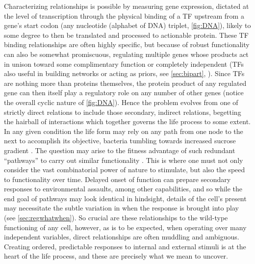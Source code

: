 Characterizing relationships is possible by measuring gene expression, dictated at the level of transcription through the physical binding of a TF upstream from a gene's start codon (any nucleotide (alphabet of DNA) triplet, \cref{fig:DNA}), likely to some degree to then be translated and processed to actionable protein. These TF binding relationships are often highly specific, but because of robust functionality can also be somewhat promiscuous, regulating multiple genes whose products act in unison toward some complimentary function or completely independent (TFs also useful in building networks or acting as priors, see \cref{sec:bipart}, \citep{ogris2017funcoup}). Since TFs are nothing more than proteins themselves, the protein product of any regulated gene can then itself play a regulatory role on any number of other genes (notice the overall cyclic nature of \cref{fig:DNA}). Hence the problem evolves from one of strictly direct relations to include those secondary, \etc indirect relations, begetting the hairball of interactions which together governs the life process to some extent. In any given condition the life form may rely on any path from one node to the next to accomplish its objective, \eg bacteria tumbling towards increased sucrose gradient \citep{di2005chemogenomic}. The question may arise to the fitness advantage of such redundant ``pathways'' to carry out similar functionality \citep{layek2011biological}. This is where one must not only consider the vast combinatorial power of nature to stimulate, but also the speed to functionality over time. Delayed onset of function can prepare secondary responses to environmental assaults, among other capabilities, and so while the end goal of pathways may look identical in hindsight, details of the cell's present may necessitate the subtle variation in when the response is brought into play (see \cref{sec:regwhatwhen}). So crucial are these relationships to the wild-type functioning of any cell, however, as is to be expected, when operating over many independent variables, direct relationships are often muddling and ambiguous. Creating ordered, predictable responses to internal and external stimuli is at the heart of the life process, and these are precisely what we mean to uncover.

